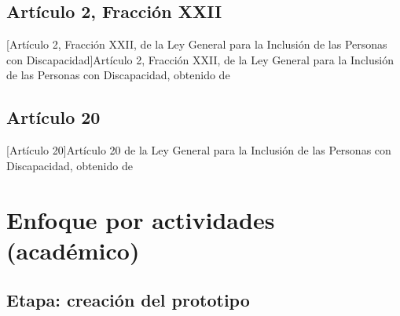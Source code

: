 \section{Artículo 2, Fracción XXII}
\begin{center}
    [Artículo 2, Fracción XXII, de la Ley General para la Inclusión de las Personas con Discapacidad]{Artículo 2, Fracción XXII, de la Ley General para la Inclusión de las Personas con Discapacidad, obtenido de \cite{ref34}}
\end{center}

\section{Artículo 20}
\begin{center}
    [Artículo 20]{Artículo 20 de la Ley General para la Inclusión de las Personas con Discapacidad, obtenido de \cite{ref34}}
\end{center}

\chapter{Enfoque por actividades (académico)}
\label{anexo:actividades_academicas}  %
\section{Etapa: creación del prototipo}


